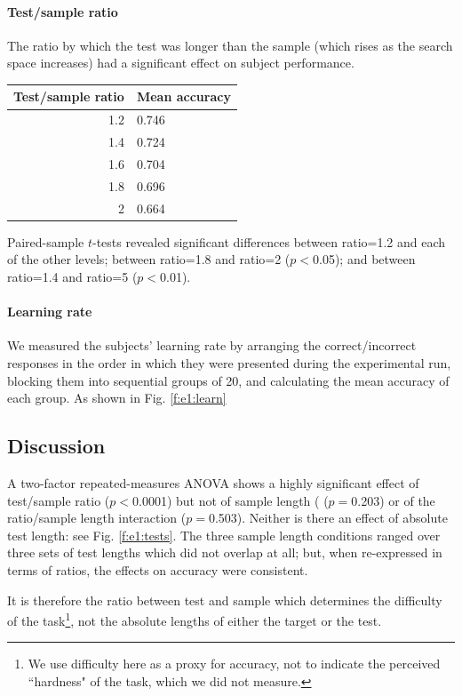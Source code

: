 \paragraph{Test/sample ratio}

The ratio by which the test was longer than the sample (which rises as the search space increases) had a significant effect on subject performance.

\begin{center}
\begin{tabular}{ r | l   }
\textbf{Test/sample ratio} & \textbf{Mean accuracy}\\
\hline
1.2 &  0.746\\
1.4 &  0.724\\
1.6 & 0.704\\
1.8 &  0.696\\
 2&  0.664\\
\end{tabular}
\end{center}

Paired-sample $t$-tests revealed significant differences between ratio=1.2 and each of the other levels; between ratio=1.8 and ratio=2 ($p<$0.05); and between ratio=1.4 and ratio=5 ($p<$0.01).

\paragraph{Learning rate}

We measured the subjects' learning rate by arranging the correct/incorrect responses in the order in which they were presented during the experimental run, blocking them into sequential groups of 20, and calculating the mean accuracy of each group. As shown in Fig. \ref{f:e1:learn}

\subsection{Discussion}

A two-factor repeated-measures ANOVA shows a highly significant effect of test/sample ratio ($p<$0.0001) but not of sample length ( ($p=$0.203) or of the ratio/sample length interaction ($p=$0.503). Neither is there an effect of absolute test length: see Fig. \ref{f:e1:tests}. The three sample length conditions ranged over three sets of test lengths which did not overlap at all; but, when re-expressed in terms of ratios, the effects on accuracy were consistent.

It is therefore the ratio between test and sample which determines the difficulty of the task\footnote{We use difficulty here as a proxy for accuracy, not to indicate the perceived ``hardness" of the task, which we did not measure.}, not the absolute lengths of either the target or the test.

